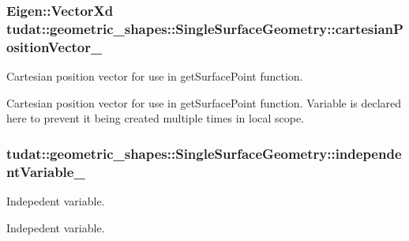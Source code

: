 \subsubsection[{\texorpdfstring{cartesian\+Position\+Vector\+\_\+}{cartesianPositionVector_}}]{\setlength{\rightskip}{0pt plus 5cm}Eigen\+::\+Vector\+Xd tudat\+::geometric\+\_\+shapes\+::\+Single\+Surface\+Geometry\+::cartesian\+Position\+Vector\+\_\+\hspace{0.3cm}{\ttfamily [protected]}}\hypertarget{classtudat_1_1geometric__shapes_1_1SingleSurfaceGeometry_aa23bba50be6214d1621308761d8e3bb1}{}\label{classtudat_1_1geometric__shapes_1_1SingleSurfaceGeometry_aa23bba50be6214d1621308761d8e3bb1}


Cartesian position vector for use in get\+Surface\+Point function. 

Cartesian position vector for use in get\+Surface\+Point function. Variable is declared here to prevent it being created multiple times in local scope. 
\subsubsection[{\texorpdfstring{independent\+Variable\+\_\+}{independentVariable_}}]{ tudat\+::geometric\+\_\+shapes\+::\+Single\+Surface\+Geometry\+::independent\+Variable\+\_\+\hspace{0.3cm}{\ttfamily [protected]}}\hypertarget{classtudat_1_1geometric__shapes_1_1SingleSurfaceGeometry_a8f811cfd5b699c23341a79e271bb3cb2}{}\label{classtudat_1_1geometric__shapes_1_1SingleSurfaceGeometry_a8f811cfd5b699c23341a79e271bb3cb2}


Indepedent variable. 

Indepedent variable. 
